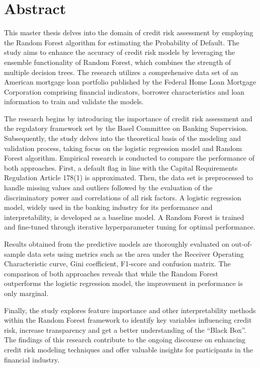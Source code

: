 \chapter*{Abstract}

This master thesis delves into the domain of credit risk assessment by employing the Random Forest algorithm for estimating the Probability of Default. The study aims to enhance the accuracy of credit risk models by leveraging the ensemble functionality of Random Forest, which combines the strength of multiple decision trees. The research utilizes a comprehensive data set of an American mortgage loan portfolio published by the Federal Home Loan Mortgage Corporation comprising financial indicators, borrower characteristics and loan information to train and validate the models.

The research begins by introducing the importance of credit risk assessment and the regulatory framework set by the Basel Committee on Banking Supervision. Subsequently, the study delves into the theoretical basis of the modeling and validation process, taking focus on the logistic regression model and Random Forest algorithm. Empirical research is conducted to compare the performance of both approaches. First, a default flag in line with the Capital Requirements Regulation Article 178(1) is approximated. Then, the data set is preprocessed to handle missing values and outliers followed by the evaluation of the discriminatory power and correlations of all risk factors. A logistic regression model, widely used in the banking industry for its performance and interpretability, is developed as a baseline model. A Random Forest is trained and fine-tuned through iterative hyperparameter tuning for optimal performance.

Results obtained from the predictive models are thoroughly evaluated on out-of-sample data sets using metrics such as the area under the Receiver Operating Characteristic curve, Gini coefficient, F1-score and confusion matrix. The comparison of both approaches reveals that while the Random Forest outperforms the logistic regression model, the improvement in performance is only marginal. 

Finally, the study explores feature importance and other interpretability methods within the Random Forest framework to identify key variables influencing credit risk, increase transparency and get a better understanding of the “Black Box”. The findings of this research contribute to the ongoing discourse on enhancing credit risk modeling techniques and offer valuable insights for participants in the financial industry.